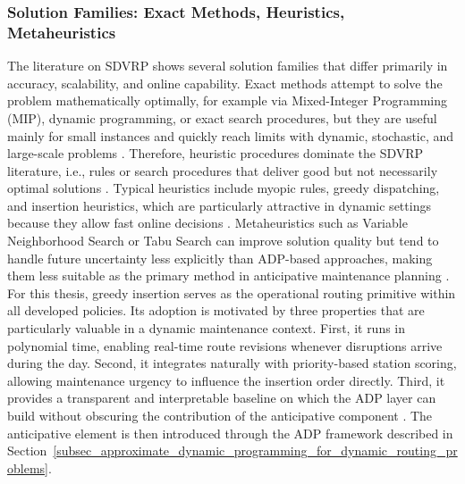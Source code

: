 \documentclass[12pt,oneside]{article}
\begin{document}
\subsubsection{Solution Families: Exact Methods, Heuristics, Metaheuristics}
The literature on SDVRP shows several solution families that differ primarily in accuracy, scalability, and online capability. Exact methods attempt to solve the problem mathematically optimally, for example via Mixed-Integer Programming (MIP), dynamic programming, or exact search procedures, but they are useful mainly for small instances and quickly reach limits with dynamic, stochastic, and large-scale problems \citep{pillac2013review, ritzinger2016survey}.
Therefore, heuristic procedures dominate the SDVRP literature, i.e., rules or search procedures that deliver good but not necessarily optimal solutions \citep{mardevsic2023review}. Typical heuristics include myopic rules, greedy dispatching, and insertion heuristics, which are particularly attractive in dynamic settings because they allow fast online decisions \citep{pillac2013review}. Metaheuristics such as Variable Neighborhood Search or Tabu Search can improve solution quality but tend to handle future uncertainty less explicitly than ADP-based approaches, making them less suitable as the primary method in anticipative maintenance planning \citep{ulmer2019offline}.
For this thesis, greedy insertion serves as the operational routing primitive within all developed policies. Its adoption is motivated by three properties that are particularly valuable in a dynamic maintenance context. First, it runs in polynomial time, enabling real-time route revisions whenever disruptions arrive during the day. Second, it integrates naturally with priority-based station scoring, allowing maintenance urgency to influence the insertion order directly. Third, it provides a transparent and interpretable baseline on which the ADP layer can build without obscuring the contribution of the anticipative component \citep{pillac2013review}. The anticipative element is then introduced through the ADP framework described in Section~\ref{subsec_approximate_dynamic_programming_for_dynamic_routing_problems}.
\end{document}
